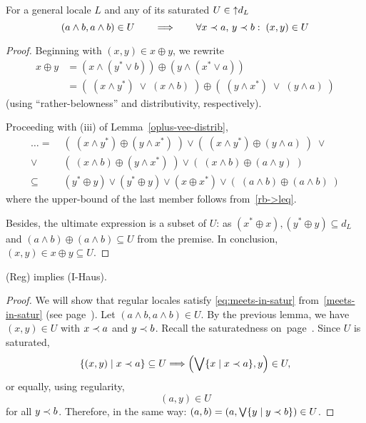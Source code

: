 \begin{lem}
  For a general locale $L$ and any of its saturated $U\in \left\uparrow
  d_L\right.$
  \[
    (a \wedge b, a \wedge b) \in U \qquad \Longrightarrow \qquad \forall x \prec
    a, \, y \prec b: \; (x, y) \in U
  \]
\end{lem}
\begin{proof}
  Beginning with $(x, y)\in x \oplus y$, we rewrite
  \begin{align*}
    x \oplus y &= (x \wedge (y^* \vee b)) \oplus (y \wedge (x^* \vee a)) \\
               &= (\; (x \wedge y^*) \; \vee \; (x \wedge b) \; ) \oplus (\; (y
    \wedge x^*) \; \vee \; (y \wedge a) \; )
  \end{align*}
  (using ``rather-belowness'' and distributivity, respectively).

  Proceeding with (iii) of Lemma~\ref{oplus-vee-distrib}\thinspace,
  \begin{align*}
     \ldots = \; &(\; (x \wedge y^*) \oplus (y \wedge x^*) \; ) \vee 
            (\; (x \wedge y^*) \oplus (y \wedge a) \; ) \; \vee \\
            \vee \; &(\; (x \wedge b) \oplus (y \wedge x^*) \; ) \vee
            (\; (x \wedge b) \oplus (a \wedge y) \; ) \\
     \subseteq \; &(y^*\oplus y) \vee (y^*\oplus y) \vee (x\oplus x^*) \vee (\;
            (a \wedge b)\oplus(a \wedge b) \;)
  \end{align*}
  where the upper-bound of the last member follows
  from~\ref{rb->leq}\thinspace.

  Besides, the ultimate expression is a subset of $U$:
  as $(x^*\oplus x), (y^*\oplus y)\subseteq d_L$ and $(a \wedge b)\oplus(a
  \wedge b)\subseteq U$ from the premise.
  In conclusion, $(x, y)\in x \oplus y \subseteq U$.
\end{proof}

\begin{thm}
  (Reg) implies (I-Haus).
\end{thm}
\begin{proof}
  We will show that regular locales satisfy \eqref{eq:meets-in-satur}\thinspace
  from~\ref{meets-in-satur} (see page~\pageref{meets-in-satur}).
  Let $(a \wedge b, a \wedge b) \in U$.
  By the previous lemma, we have $(x, y)\in U$ with $x \prec a$ and $y \prec b$.
  Recall the saturatedness on~page~\pageref{df:satur}\thinspace.
  Since $U$ is saturated,
  \[
    \left\{ (x, y) \mid x \prec a \right\} \subseteq U
    \Longrightarrow
    \left(\bigvee \{x \mid x \prec a\}, y\right)\in U,
  \]
  or equally, using regularity,
  \[
    \left(a, y\right)\in U
  \]
  for all $y \prec b$.
  Therefore, in the same way:
  $(a, b) = \left(a, \bigvee \{y \mid y \prec b\}\right)\in U$.
\end{proof}

